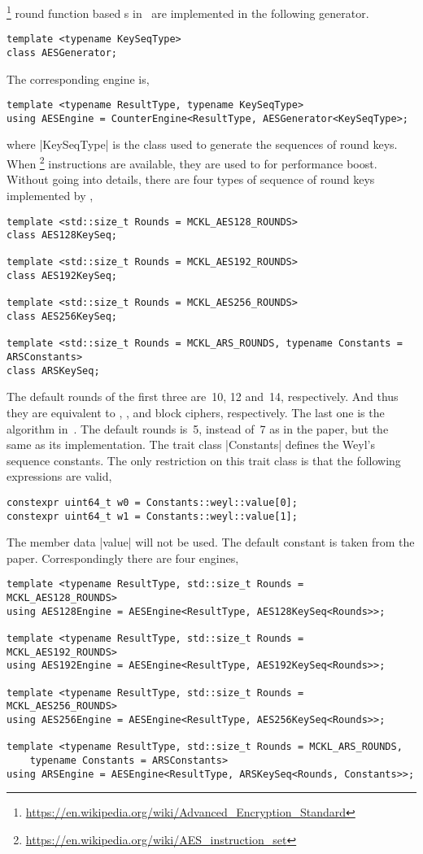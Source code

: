 \aes\footnote{\url{https://en.wikipedia.org/wiki/Advanced_Encryption_Standard}}
round function based \rng{}s in~\cite{Salmon:2011um} are implemented in the
following generator.
\begin{verbatim}
template <typename KeySeqType>
class AESGenerator;
\end{verbatim}
The corresponding \rng engine is,
\begin{verbatim}
template <typename ResultType, typename KeySeqType>
using AESEngine = CounterEngine<ResultType, AESGenerator<KeySeqType>;
\end{verbatim}
where |KeySeqType| is the class used to generate the sequences of round keys.
When \aesni\footnote{\url{https://en.wikipedia.org/wiki/AES_instruction_set}}
instructions are available, they are used to for performance boost. Without
going into details, there are four types of sequence of round keys implemented
by \mckl,
\begin{verbatim}
template <std::size_t Rounds = MCKL_AES128_ROUNDS>
class AES128KeySeq;

template <std::size_t Rounds = MCKL_AES192_ROUNDS>
class AES192KeySeq;

template <std::size_t Rounds = MCKL_AES256_ROUNDS>
class AES256KeySeq;

template <std::size_t Rounds = MCKL_ARS_ROUNDS, typename Constants = ARSConstants>
class ARSKeySeq;
\end{verbatim}
The default rounds of the first three are~10, 12 and~14, respectively. And thus
they are equivalent to , , and  block ciphers,
respectively. The last one is the \ars algorithm in~\cite{Salmon:2011um}. The
default rounds is~5, instead of~7 as in the paper, but the same as its \mkl
implementation. The trait class |Constants| defines the Weyl's sequence
constants. The only restriction on this trait class is that the following
expressions are valid,
\begin{verbatim}
constexpr uint64_t w0 = Constants::weyl::value[0];
constexpr uint64_t w1 = Constants::weyl::value[1];
\end{verbatim}
The member data |value| will not be \odr used. The default constant is taken
from the paper. Correspondingly there are four \rng engines,
\begin{verbatim}
template <typename ResultType, std::size_t Rounds = MCKL_AES128_ROUNDS>
using AES128Engine = AESEngine<ResultType, AES128KeySeq<Rounds>>;

template <typename ResultType, std::size_t Rounds = MCKL_AES192_ROUNDS>
using AES192Engine = AESEngine<ResultType, AES192KeySeq<Rounds>>;

template <typename ResultType, std::size_t Rounds = MCKL_AES256_ROUNDS>
using AES256Engine = AESEngine<ResultType, AES256KeySeq<Rounds>>;

template <typename ResultType, std::size_t Rounds = MCKL_ARS_ROUNDS,
    typename Constants = ARSConstants>
using ARSEngine = AESEngine<ResultType, ARSKeySeq<Rounds, Constants>>;
\end{verbatim}
